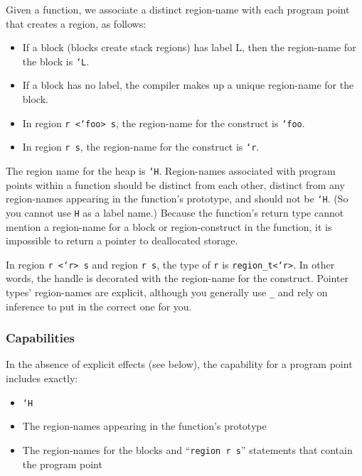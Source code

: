 Given a function, we associate a distinct region-name with each
program point that creates a region, as follows:

\begin{itemize}
\item If a block (blocks create stack regions) has label L, then the
  region-name for the block is \texttt{`L}.
\item If a block has no label, the compiler makes up a unique
  region-name for the block.
\item In region \texttt{r <`foo> s}, the region-name for the construct
  is \texttt{`foo}.
\item In region \texttt{r s}, the region-name for the construct is
  \texttt{`r}.
\end{itemize}

The region name for the heap is \texttt{`H}.  Region-names associated
with program points within a function should be distinct from each
other, distinct from any region-names appearing in the function's
prototype, and should not be \texttt{`H}.  (So you cannot use \texttt{H}
as a label name.)  Because the function's return type cannot mention a
region-name for a block or region-construct in the function, it is
impossible to return a pointer to deallocated storage.

In region \texttt{r <`r> s} and region \texttt{r s}, the type of \texttt{r}
is \texttt{region_t<`r>}.  In other words, the handle is decorated with
the region-name for the construct.  Pointer types' region-names are
explicit, although you generally use \texttt{_} and rely on inference to
put in the correct one for you.

\subsubsection{Capabilities}

In the absence of explicit effects (see below), the capability for a
program point includes exactly:
\begin{itemize}
\item \texttt{`H}
\item The region-names appearing in the function's prototype 
\item The region-names for the blocks and ``\texttt{region r s}''
  statements that contain the program point
\end{itemize}

